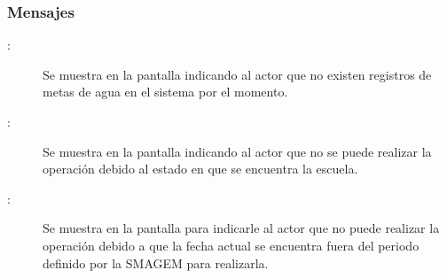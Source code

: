 \subsubsection{Mensajes}

    \begin{description}
	\item [:] Se muestra en la pantalla  indicando al actor que no existen registros de metas de agua en el sistema por el momento.
	
	\item [:] Se muestra en la pantalla  indicando al actor que no se puede realizar la operación debido al estado en que se encuentra la escuela.
	
	\item [:] Se muestra en la pantalla  para indicarle al actor que no puede realizar la operación debido a que la fecha actual se encuentra fuera del periodo definido por la SMAGEM para realizarla.
    \end{description}
